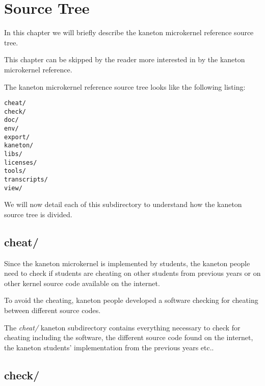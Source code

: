 
%
%

\chapter{Source Tree}

In this chapter we will briefly describe the kaneton microkernel reference
source tree.

This chapter can be skipped by the reader more interested in by the
kaneton microkernel reference.

\newpage

%
%

The kaneton microkernel reference source tree looks like the following
listing:

\begin{verbatim}
cheat/
check/
doc/
env/
export/
kaneton/
libs/
licenses/
tools/
transcripts/
view/
\end{verbatim}

We will now detail each of this subdirectory to understand how the
kaneton source tree is divided.

%
%

\section{cheat/}

Since the kaneton microkernel is implemented by students, the kaneton
people need to check if students are cheating on other students from
previous years or on other kernel source code available on the internet.

To avoid the cheating, kaneton people developed a software checking
for cheating between different source codes.

The \textit{cheat/} kaneton subdirectory contains everything necessary
to check for cheating including the software, the different source code
found on the internet, the kaneton students' implementation from the
previous years etc..

%
%

\section{check/}

